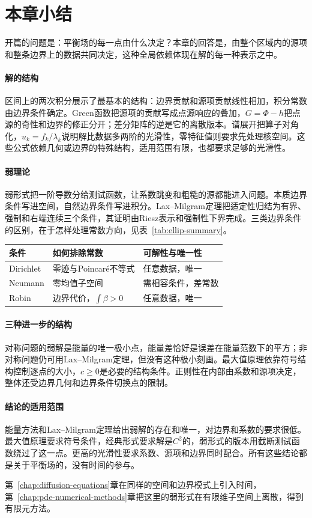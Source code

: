 \section{本章小结}
\label{sec:ellip-summary}

开篇的问题是：平衡场的每一点由什么决定？本章的回答是，由整个区域内的源项和整条边界上的数据共同决定，这种全局依赖体现在解的每一种表示之中。

\paragraph{解的结构}
区间上的两次积分展示了最基本的结构：边界贡献和源项贡献线性相加，积分常数由边界条件确定。Green函数把源项的贡献写成点源响应的叠加，$G=\Phi-h$把点源的奇性和边界的修正分开；差分矩阵的逆是它的离散版本。谱展开把算子对角化，$u_k=f_k/\lambda_k$说明解比数据多两阶的光滑性，零特征值则要求先处理核空间。这些公式依赖几何或边界的特殊结构，适用范围有限，也都要求足够的光滑性。

\paragraph{弱理论}
弱形式把一阶导数分给测试函数，让系数跳变和粗糙的源都能进入问题。本质边界条件写进空间，自然边界条件写进积分。Lax--Milgram定理把适定性归结为有界、强制和右端连续三个条件，其证明由Riesz表示和强制性下界完成。三类边界条件的区别，在于怎样处理常数方向，见表~\ref{tab:ellip-summary}。

\begin{BookInlineTable}
  \centering
  \caption{三类边界条件的适定性（$\Omega$有界连通，$\bm{A}$一致椭圆）。}
  \label{tab:ellip-summary}
  \begin{tabular}{lll}
    \toprule
    条件 & 如何排除常数 & 可解性与唯一性\\
    \midrule
    Dirichlet & 零迹与Poincaré不等式 & 任意数据，唯一\\
    Neumann & 零均值子空间 & 需相容条件，差常数\\
    Robin & 边界代价，$\int\beta>0$ & 任意数据，唯一\\
    \bottomrule
  \end{tabular}
\end{BookInlineTable}

\paragraph{三种进一步的结构}
对称问题的弱解是能量的唯一极小点，能量差恰好是误差在能量范数下的平方；非对称问题仍可用Lax--Milgram定理，但没有这种极小刻画。最大值原理依靠符号结构控制逐点的大小，$c\geq0$是必要的结构条件。正则性在内部由系数和源项决定，整体还受边界几何和边界条件切换点的限制。

\paragraph{结论的适用范围}
能量方法和Lax--Milgram定理给出弱解的存在和唯一，对边界和系数的要求很低。最大值原理要求符号条件，经典形式要求解是$C^2$的，弱形式的版本用截断测试函数绕过了这一点。更高的光滑性要求系数、源项和边界同时配合。所有这些结论都是关于平衡场的，没有时间的参与。

第~\ref{chap:diffusion-equations}章在同样的空间和边界模式上引入时间，第~\ref{chap:pde-numerical-methods}章把这里的弱形式在有限维子空间上离散，得到有限元方法。
